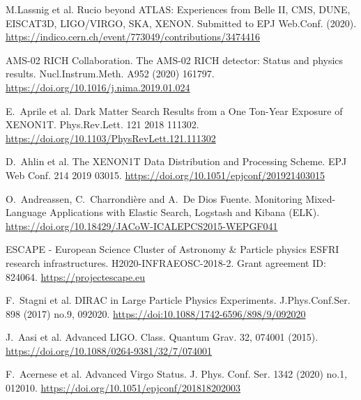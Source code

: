 \documentclass[11pt]{article}
\begin{document}
\begin{thebibliography}{99}
\begin{small}
M.Lassnig et al.
Rucio beyond ATLAS: Experiences from Belle II, CMS, DUNE, EISCAT3D, LIGO/VIRGO, SKA, XENON.
\newblock Submitted to EPJ Web.Conf. (2020).
\newblock \href{https://indico.cern.ch/event/773049/contributions/3474416/attachments/1937611/3211761/Rucio_CHEP19.pdf}{https://indico.cern.ch/event/773049/contributions/3474416}

AMS-02 RICH Collaboration.
\newblock The AMS-02 RICH detector: Status and physics results.
\newblock Nucl.Instrum.Meth. A952 (2020) 161797.
\newblock \href{https://doi.org/10.1016/j.nima.2019.01.024}{https://doi.org/10.1016/j.nima.2019.01.024}

E.~Aprile et al.
\newblock Dark Matter Search Results from a One Ton-Year Exposure of XENON1T.
\newblock Phys.Rev.Lett. 121 2018 111302.
\newblock \href{https://doi.org/10.1103/PhysRevLett.121.111302}{https://doi.org/10.1103/PhysRevLett.121.111302}

D.~Ahlin et al.
\newblock The XENON1T Data Distribution and Processing Scheme.
\newblock EPJ Web Conf. 214 2019 03015.
\newblock \href{https://doi.org/10.1051/epjconf/201921403015}{https://doi.org/10.1051/epjconf/201921403015}

O.~Andreassen, C.~Charrondière and A.~De Dios Fuente.
\newblock Monitoring Mixed-Language Applications with Elastic Search, Logstash and Kibana (ELK).
\newblock \href{https://doi.org/10.18429/JACoW-ICALEPCS2015-WEPGF041}{https://doi.org/10.18429/JACoW-ICALEPCS2015-WEPGF041}

ESCAPE - European Science Cluster of Astronomy \& Particle physics ESFRI research infrastructures.
\newblock H2020-INFRAEOSC-2018-2.
\newblock Grant agreement ID: 824064.
\newblock \href{https://projectescape.eu}{https://projectescape.eu}

F.~Stagni et al.
\newblock DIRAC in Large Particle Physics Experiments.
\newblock  J.Phys.Conf.Ser. 898 (2017) no.9, 092020.
\newblock \href{https://doi:10.1088/1742-6596/898/9/092020}{https://doi:10.1088/1742-6596/898/9/092020}

J.~Aasi et al.
\newblock Advanced LIGO.
\newblock Class. Quantum Grav. 32, 074001 (2015).
\newblock \href{https://doi.org/10.1088/0264-9381/32/7/074001}{https://doi.org/10.1088/0264-9381/32/7/074001}

F.~Acernese et al.
\newblock Advanced Virgo Status.
\newblock J. Phys. Conf. Ser. 1342 (2020) no.1,  012010.
\newblock \href{https://doi.org/10.1051/epjconf/201818202003}{https://doi.org/10.1051/epjconf/201818202003}


\end{small}
\end{thebibliography}
\end{document}
